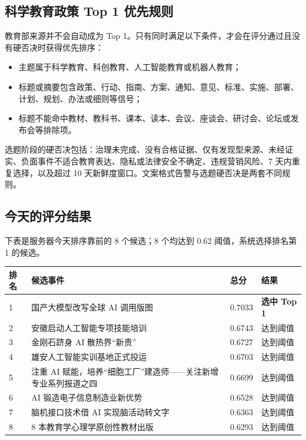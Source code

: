 \documentclass[UTF8,11pt,a4paper,fontset=none]{ctexart}
\begin{document}
\subsection{科学教育政策 Top 1 优先规则}

教育部来源并不会自动成为 Top 1。只有同时满足以下条件，才会在评分通过且没有硬否决时获得优先排序：

\begin{itemize}[leftmargin=1.6em,itemsep=0.25em]
  \item 主题属于科学教育、科创教育、人工智能教育或机器人教育；
  \item 标题或摘要包含政策、行动、指南、方案、通知、意见、标准、实施、部署、计划、规划、办法或细则等信号；
  \item 标题不能命中教材、教科书、课本、读本、会议、座谈会、研讨会、论坛或发布会等排除项。
\end{itemize}

选题阶段的硬否决包括：治理未完成、没有合格证据、仅有发现型来源、未经证实、负面事件不适合教育表达、隐私或法律安全不确定、违规营销风险、7 天内重复选择，以及超过 10 天新鲜度窗口。文案格式告警与选题硬否决是两套不同规则。

\subsection{今天的评分结果}

下表是服务器今天排序靠前的 8 个候选；8 个均达到 0.62 阈值，系统选择排名第 1 的候选。

\renewcommand{\arraystretch}{1.25}
\begin{longtable}{L{0.7cm}L{10.3cm}L{1.5cm}L{2.0cm}}
\toprule
{}
\color{white}\bfseries\sffamily 排名 & \color{white}\bfseries\sffamily 候选事件 & \color{white}\bfseries\sffamily 总分 & \color{white}\bfseries\sffamily 结果 \\
\midrule
\endhead
{} 1 & 国产大模型改写全球 AI 调用版图 & 0.7033 & \textbf{选中 Top 1} \\
2 & 安徽启动人工智能专项技能培训 & 0.6743 & 达到阈值 \\
 3 & 金刚石跻身 AI 散热界“新贵” & 0.6727 & 达到阈值 \\
4 & 雄安人工智能实训基地正式投运 & 0.6703 & 达到阈值 \\
 5 & 注重 AI 赋能，培养“细胞工厂”建造师——关注新增专业系列报道之四 & 0.6699 & 达到阈值 \\
6 & AI 锻造电子信息制造业新优势 & 0.6528 & 达到阈值 \\
 7 & 脑机接口技术借 AI 实现脑活动转文字 & 0.6363 & 达到阈值 \\
8 & 8 本教育学心理学原创性教材出版 & 0.6293 & 达到阈值 \\
\bottomrule
\end{longtable}
\end{document}
